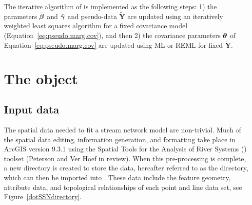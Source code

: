 \documentclass[nojss]{jss}
\def\btheta{\mbox{\boldmath $\theta$}}
\def\bbeta{\mbox{\boldmath $\beta$}}
\def\bgamma{\mbox{\boldmath $\gamma$}}
\def\bY{\textbf{Y}}
\begin{document}
The iterative algorithm of \citet{Wolf:Ocon:gene:1993} is implemented
as the following steps: 1) the parameters $\tilde{\bbeta}$ and
$\tilde{\bgamma}$ and pseudo-data $\tilde{\bY}$ are updated using an
iteratively weighted least squares algorithm
\citep[e.g.,][pg. 40]{McCu:Neld:gene:1989} for a fixed covariance
model (Equation~\ref{eq:pseudo.marg.cov}), and then 2) the covariance
parameters $\btheta$ of Equation~\ref{eq:pseudo.marg.cov} are updated
using ML or REML for fixed $\tilde{\bY}$.

%
%

\section[The S4 SpatialStreamNetwork object]{The   object} \label{S4SSNobject}

\subsection{Input data}

The spatial data needed to fit a stream network model are
non-trivial. Much of the spatial data editing, information generation,
and formatting take place in ArcGIS version 9.3.1 using the Spatial
Tools for the Analysis of River Systems () toolset
(Peterson and Ver Hoef in review). When this pre-processing is
complete, a new directory is created to store the data, hereafter
referred to as the  directory, which can then be imported
into . These data include the feature geometry, attribute
data, and topological relationships of each point and line data set,
see Figure~\ref{dotSSNdirectory}.
\end{document}
